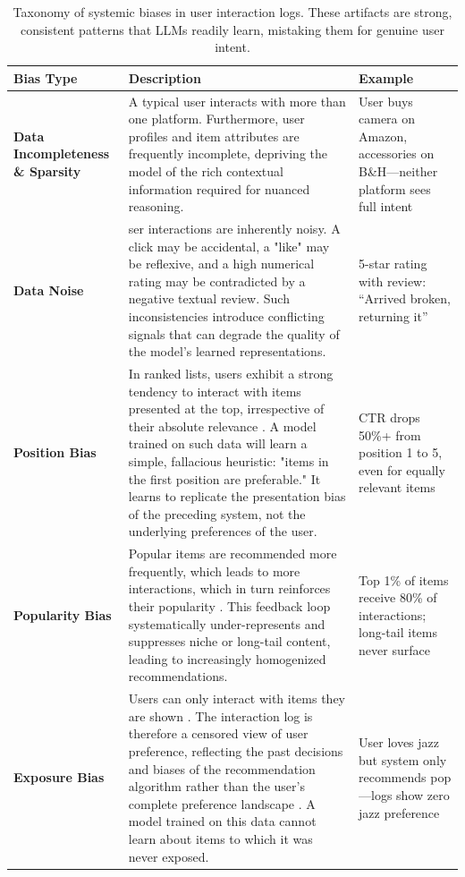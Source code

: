 \documentclass[]{fairmeta}
\begin{document}
  \begin{table}[h]
  \centering
  \small
  \begin{tabular}{p{2cm}|p{9cm}|p{4cm}}
  \toprule
  \textbf{Bias Type} & \textbf{Description} & \textbf{Example} \\
  \midrule
  \textbf{Data Incompleteness \& Sparsity} &A typical user interacts with more than one platform. Furthermore, user profiles and item attributes are frequently incomplete, depriving the model of the rich contextual information required for nuanced reasoning. & User buys camera on Amazon, accessories on B\&H---neither platform sees full intent \\
  \midrule
  \textbf{Data Noise} & ser interactions are inherently noisy. A click may be accidental, a "like" may be reflexive, and a high numerical rating may be contradicted by a negative textual review. Such inconsistencies introduce conflicting signals that can degrade the quality of the model's learned representations. & 5-star rating with review: ``Arrived broken, returning it'' \\
  \midrule
  \textbf{Position Bias} & In ranked lists, users exhibit a strong tendency to interact with items presented at the top, irrespective of their absolute relevance \cite{bito2025evaluatingpositionbiaslarge,10.1145/3652864}. A model trained on such data will learn a simple, fallacious heuristic: "items in the first position are preferable." It learns to replicate the presentation bias of the preceding system, not the underlying preferences of the user. & CTR drops 50\%+ from position 1 to 5, even for equally relevant items \\
  \midrule
  \textbf{Popularity Bias} & Popular items are recommended more frequently, which leads to more interactions, which in turn reinforces their popularity \cite{braun2023metricspopularitybiasdynamic, 10.1145/3771279, 10.1145/3604915.3608825, Klimashevskaia_2024}. This feedback loop systematically under-represents and suppresses niche or long-tail content, leading to increasingly homogenized recommendations. & Top 1\% of items receive 80\% of interactions; long-tail items never surface \\
  \midrule
  \textbf{Exposure Bias} & Users can only interact with items they are shown . The interaction log is therefore a censored view of user preference, reflecting the past decisions and biases of the recommendation algorithm rather than the user's complete preference landscape \cite{mansoury2022exposureawarerecommendationusingcontextual, xu2025enhancinginterpretabilityeffectivenessrecommendation}. A model trained on this data cannot learn about items to which it was never exposed. & User loves jazz but system only recommends pop---logs show zero jazz preference \\
  \bottomrule
  \end{tabular}
  \caption{Taxonomy of systemic biases in user interaction logs. These artifacts are strong, consistent patterns that LLMs readily learn, mistaking them for genuine user intent.}
  \label{tab:data_biases}
  \end{table}
\end{document}
